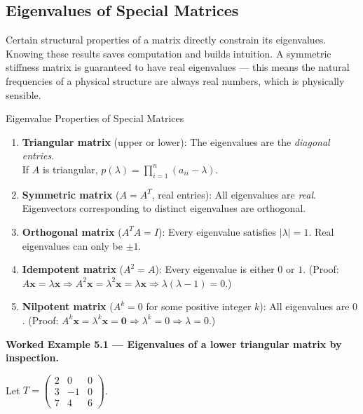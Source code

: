 \documentclass[12pt,a4paper]{article}
\begin{document}
\subsection{Eigenvalues of Special Matrices}

Certain structural properties of a matrix directly constrain its eigenvalues.
Knowing these results saves computation and builds intuition.
A symmetric stiffness matrix is guaranteed to have real eigenvalues --- this means
the natural frequencies of a physical structure are always real numbers, which is physically sensible.

\begin{infobox}{Eigenvalue Properties of Special Matrices}
\begin{enumerate}
  \item \textbf{Triangular matrix} (upper or lower):
        The eigenvalues are the \emph{diagonal entries}. \\
        If $A$ is triangular, $p(\lambda) = \prod_{i=1}^n (a_{ii} - \lambda)$.

  \item \textbf{Symmetric matrix} ($A = A^T$, real entries):
        All eigenvalues are \emph{real}. Eigenvectors corresponding to distinct eigenvalues
        are orthogonal.

  \item \textbf{Orthogonal matrix} ($A^T A = I$):
        Every eigenvalue satisfies $|\lambda| = 1$.
        Real eigenvalues can only be $\pm 1$.

  \item \textbf{Idempotent matrix} ($A^2 = A$):
        Every eigenvalue is either $0$ or $1$.
        (Proof: $A\mathbf{x}=\lambda\mathbf{x} \Rightarrow A^2\mathbf{x}=\lambda^2\mathbf{x}=\lambda\mathbf{x} \Rightarrow \lambda(\lambda-1)=0$.)

  \item \textbf{Nilpotent matrix} ($A^k = 0$ for some positive integer $k$):
        All eigenvalues are $0$.
        (Proof: $A^k\mathbf{x}=\lambda^k\mathbf{x}=\mathbf{0} \Rightarrow \lambda^k=0 \Rightarrow \lambda=0$.)
\end{enumerate}
\end{infobox}

\textbf{Worked Example 5.1 --- Eigenvalues of a lower triangular matrix by inspection.}

Let $T = \begin{pmatrix} 2 & 0 & 0 \\ 3 & -1 & 0 \\ 7 & 4 & 6 \end{pmatrix}$.
\end{document}
